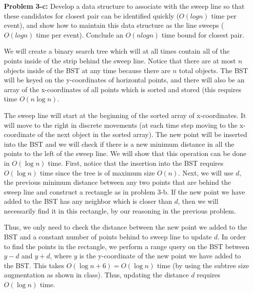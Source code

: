 \documentclass[psamsfonts]{amsart}
\newenvironment{sol}{\vspace{0.25cm}{\large \bfseries Solution:}}{\qedsymbol}
\newenvironment{prob}[1]{\begin{framed}{\large \bfseries Problem #1:}}{\end{framed}}
\begin{document}
\begin{prob}{3-c}
Develop a data structure to associate with the sweep line so that these candidates for closest pair can be identified quickly ($O(log n)$ time per event), and show how to maintain this data structure as the line sweeps ($O(log n)$ time per event). Conclude an $O(n log n)$ time bound for closest pair.
\end{prob}
\begin{sol}
We will create a binary search tree which will at all times contain all of the points inside of the strip behind the sweep line. Notice that there are at most $n$ objects inside of the BST at any time because there are $n$ total objects. The BST will be keyed on the y-coordinates of horizontal points, and there will also be an array of the x-coordinates of all points which is sorted and stored (this requires time $O(n \log n)$. 

The sweep line will start at the beginning of the sorted array of x-coordinates. It will move to the right in discrete movements (at each time step moving to the x-coordinate of the next object in the sorted array). The new point will be inserted into the BST and we will check if there is a new minimum distance in all the points to the left of the sweep line. We will show that this operation can be done in $O(\log n)$ time. First, notice that the insertion into the BST requires $O(\log n)$ time since the tree is of maximum size $O(n)$. Next, we will use $d$, the previous minimum distance between any two points that are behind the sweep line and construct a rectangle as in problem 3-b. If the new point we have added to the BST has any neighbor which is closer than $d$, then we will necessarily find it in this rectangle, by our reasoning in the previous problem. 

Thus, we only need to check the distance between the new point we added to the BST and a constant number of points behind to sweep line to update $d$. In order to find the points in the rectangle, we perform a range query on the BST between $y - d$ and $y+d$, where $y$ is the y-coordinate of the new point we have added to the BST. This takes $O(\log n + 6) = O(\log n)$ time (by using the subtree size augmentation as shown in class). Thus, updating the distance $d$ requires $O(\log n)$ time. 


\end{sol}
\end{document}
